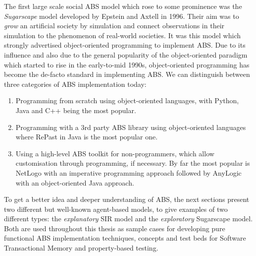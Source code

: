 The first large scale social ABS model which rose to some prominence was the \textit{Sugarscape} model developed by Epstein and Axtell in 1996. Their aim was to \textit{grow} an artificial society by simulation and connect observations in their simulation to the phenomenon of real-world societies. It was this model which strongly advertised object-oriented programming to implement ABS. Due to its influence and also due to the general popularity of the object-oriented paradigm which started to rise in the early-to-mid 1990s, object-oriented programming has become the de-facto standard in implementing ABS. We can distinguish between three categories of ABS implementation today: %
\begin{enumerate}
	\item Programming from scratch using object-oriented languages, with Python, Java and C++ being the most popular.
	\item Programming with a 3rd party ABS library using object-oriented languages where RePast \cite{north_complex_2013} in Java is the most popular one.
	\item Using a high-level ABS toolkit for non-programmers, which allow customisation through programming, if necessary. By far the most popular is NetLogo \cite{tisue2004netlogo} with an imperative programming approach followed by AnyLogic \cite{borshchev2013big} with an object-oriented Java approach.
\end{enumerate}

To get a better idea and deeper understanding of ABS, the next sections present two different but well-known agent-based models, to give examples of two different types: the \textit{explanatory} SIR model and the \textit{exploratory} Sugarscape model. Both are used throughout this thesis as sample cases for developing pure functional ABS implementation techniques, concepts and test beds for Software Transactional Memory and property-based testing.



